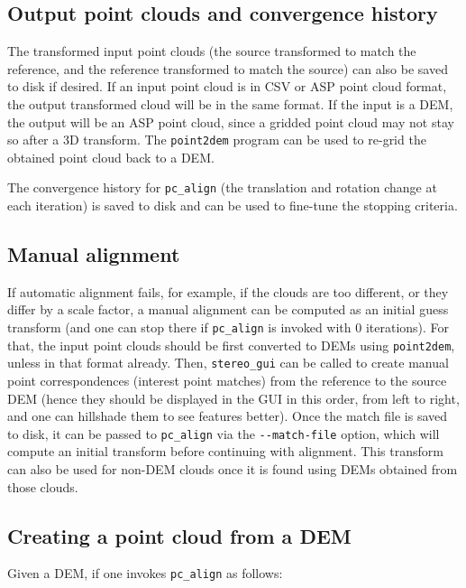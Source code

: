 \subsection{Output point clouds and convergence history}

The transformed input point clouds (the source transformed to match the
reference, and the reference transformed to match the source) can also
be saved to disk if desired. If an input point cloud is in CSV or ASP
point cloud format, the output transformed cloud will be in the same
format. If the input is a DEM, the output will be an ASP point cloud,
since a gridded point cloud may not stay so after a 3D transform. The
\texttt{point2dem} program can be used to re-grid the obtained point
cloud back to a DEM.

The convergence history for \texttt{pc\_align} (the translation and
rotation change at each iteration) is saved to disk and can be used to
fine-tune the stopping criteria.

\subsection{Manual alignment}

If automatic alignment fails, for example, if the clouds are too
different, or they differ by a scale factor, a manual alignment can be
computed as an initial guess transform (and one can stop there if
\texttt{pc\_align} is invoked with 0 iterations). For that, the input
point clouds should be first converted to DEMs using \texttt{point2dem},
unless in that format already. Then, \texttt{stereo\_gui} can be called
to create manual point correspondences (interest point matches) from the
reference to the source DEM (hence they should be displayed in the GUI
in this order, from left to right, and one can hillshade them to see
features better). Once the match file is saved to disk, it can be passed
to \texttt{pc\_align} via the \texttt{-\/-match-file} option, which will
compute an initial transform before continuing with alignment. This
transform can also be used for non-DEM clouds once it is found using
DEMs obtained from those clouds.

\subsection{Creating a point cloud from a DEM}
\label{regrid}

Given a DEM, if one invokes \texttt{pc\_align} as follows:

